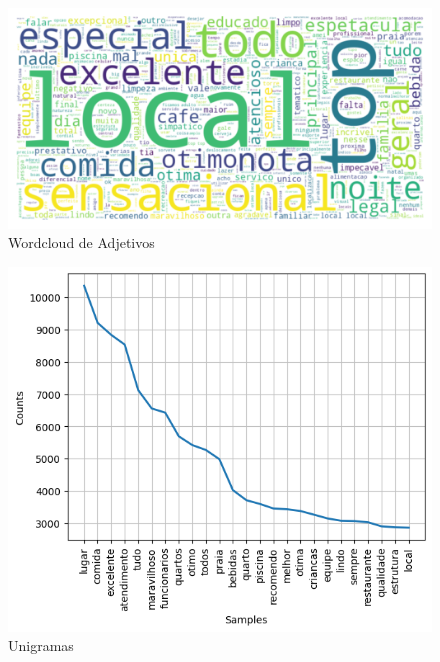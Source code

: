 \begin{figure}
	\centering
	\includegraphics[width=1\textwidth]{figs/exploratoria/wordcloud_adjetivos.png}
	\caption{Wordcloud de Adjetivos}
	\label{img:wordcloud_adjetivos}
\end{figure}

\begin{figure}
	\centering
	\includegraphics[width=1\textwidth]{figs/exploratoria/unigramas.png}
	\caption{Unigramas}
	\label{img:unigramas}
\end{figure}

